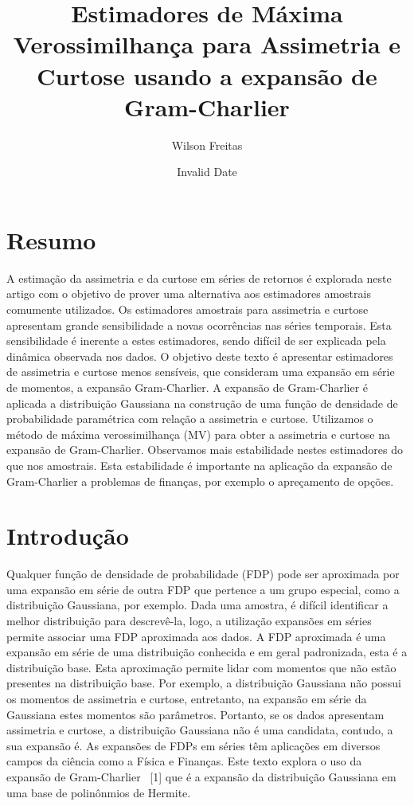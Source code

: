 \documentclass[
  letterpaper,
  DIV=11,
  numbers=noendperiod]{scrartcl}
\title{Estimadores de Máxima Verossimilhança para Assimetria e Curtose
usando a expansão de Gram-Charlier}
\author{Wilson Freitas}
\date{Invalid Date}
\begin{document}
\maketitle

\section{Resumo}\label{resumo}

A estimação da assimetria e da curtose em séries de retornos é explorada
neste artigo com o objetivo de prover uma alternativa aos estimadores
amostrais comumente utilizados. Os estimadores amostrais para assimetria
e curtose apresentam grande sensibilidade a novas ocorrências nas séries
temporais. Esta sensibilidade é inerente a estes estimadores, sendo
difícil de ser explicada pela dinâmica observada nos dados. O objetivo
deste texto é apresentar estimadores de assimetria e curtose menos
sensíveis, que consideram uma expansão em série de momentos, a expansão
Gram-Charlier. A expansão de Gram-Charlier é aplicada a distribuição
Gaussiana na construção de uma função de densidade de probabilidade
paramétrica com relação a assimetria e curtose. Utilizamos o método de
máxima verossimilhança (MV) para obter a assimetria e curtose na
expansão de Gram-Charlier. Observamos mais estabilidade nestes
estimadores do que nos amostrais. Esta estabilidade é importante na
aplicação da expansão de Gram-Charlier a problemas de finanças, por
exemplo o apreçamento de opções.

\section{Introdução}\label{introduuxe7uxe3o}

Qualquer função de densidade de probabilidade (FDP) pode ser aproximada
por uma expansão em série de outra FDP que pertence a um grupo especial,
como a distribuição Gaussiana, por exemplo. Dada uma amostra, é difícil
identificar a melhor distribuição para descrevê-la, logo, a utilização
expansões em séries permite associar uma FDP aproximada aos dados. A FDP
aproximada é uma expansão em série de uma distribuição conhecida e em
geral padronizada, esta é a distribuição base. Esta aproximação permite
lidar com momentos que não estão presentes na distribuição base. Por
exemplo, a distribuição Gaussiana não possui os momentos de assimetria e
curtose, entretanto, na expansão em série da Gaussiana estes momentos
são parâmetros. Portanto, se os dados apresentam assimetria e curtose, a
distribuição Gaussiana não é uma candidata, contudo, a sua expansão é.
As expansões de FDPs em séries têm aplicações em diversos campos da
ciência como a Física e Finanças. Este texto explora o uso da expansão
de Gram-Charlier ~{[}1{]} que é a expansão da distribuição Gaussiana em
uma base de polinônmios de Hermite.
\end{document}
